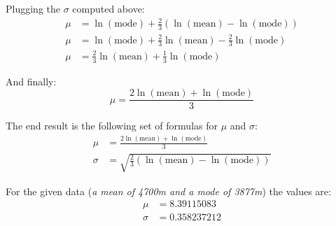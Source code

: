 \documentclass[a4paper,12pt]{article}
\begin{document}
Plugging the \(\sigma\) computed above:
\begin{align*}
  \mu &= \ln(\mbox{mode}) + \frac{2}{3}\left(\ln(\mbox{mean}) - \ln(\mbox{mode})\right)\\
  \mu &= \ln(\mbox{mode}) + \frac{2}{3}\ln(\mbox{mean}) - \frac{2}{3}\ln(\mbox{mode})\\
  \mu &= \frac{2}{3}\ln(\mbox{mean}) + \frac{1}{3}\ln(\mbox{mode})
\end{align*}

And finally:
\[\mu = \frac{2\ln(\mbox{mean}) + \ln(\mbox{mode})}{3}\tag{\(\mu\)}\]

The end result is the following set of formulas for \(\mu\) and \(\sigma\):
\begin{align*}
  \mu &= \frac{2\ln(\mbox{mean}) + \ln(\mbox{mode})}{3}\tag{\(\mu\)}\\
  \sigma &= \sqrt{\frac{2}{3}\left(\ln(\mbox{mean}) - \ln(\mbox{mode})\right)\tag{\(\sigma\)}}
\end{align*}

For the given data (\emph{a mean of 4700m and a mode of 3877m}) the values are:
\begin{align*}
  \mu &= 8.39115083\\
  \sigma &= 0.358237212
\end{align*}
\end{document}
